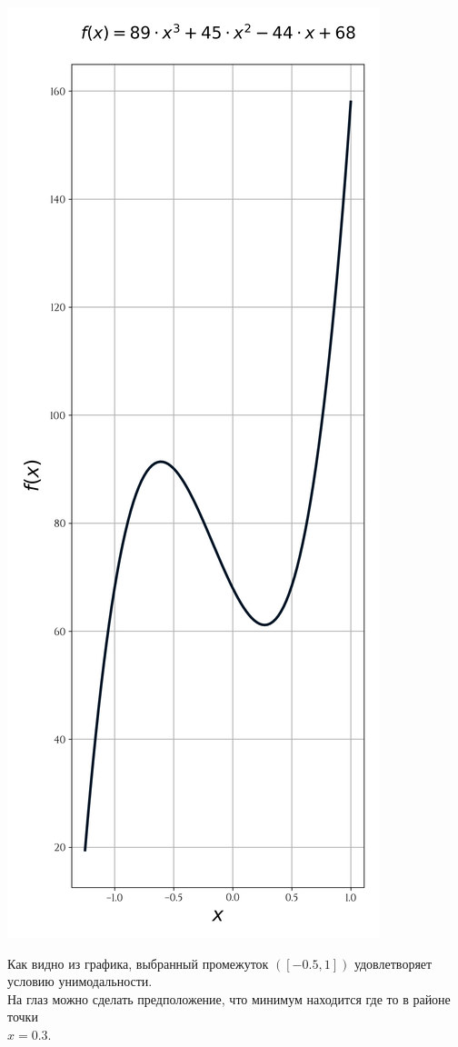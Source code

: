 \documentclass[a4paper, 14pt]{extarticle}
\begin{document}
\begin{minipage}{0.4\textwidth}
    \includegraphics[width=\linewidth]{initial_f_plot}
\end{minipage}
\hfill
\begin{minipage}{0.55\textwidth}
    Как видно из графика, выбранный промежуток $([-0.5, 1])$ удовлетворяет 
    условию унимодальности. \\

    \guillemotleft На глаз\guillemotright {} можно сделать предположение, что 
    минимум находится где то в районе точки \\$x=0.3$.
\end{minipage}
\end{document}
